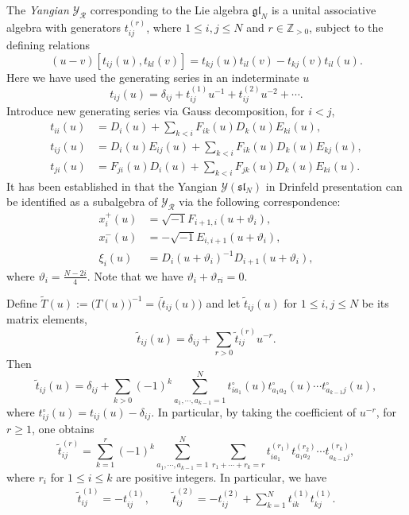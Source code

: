 \documentclass[11pt,reqno]{amsart}
\numberwithin{equation}{section}
\theoremstyle{definition}
\theoremstyle{remark}
\newcommand{\beq}{\begin{equation}}
\newcommand{\eeq}{\end{equation}}
\newcommand{\be}{\begin{equation*}}
\newcommand{\ee}{\end{equation*}}
\newcommand{\bZ}{\mathbb{Z}}
\newcommand{\gl}{\mathfrak{gl}}
\newcommand{\tl}{\tilde}
\newcommand{\wtl}{\widetilde}
\newcommand{\gge}{\geqslant}
\newcommand{\lle}{\leqslant}
\newcommand{\Y}{{\mathscr{Y}}}
\begin{document}
The \textit{Yangian} $\Y_{\mathscr R}$ corresponding to the Lie algebra $\gl_N$ is a unital associative algebra with generators $t_{ij}^{(r)}$, where $1\lle i,j\lle N$ and $r\in\bZ_{>0}$, subject to the defining relations 
\be
(u-v)[t_{ij}(u),t_{kl}(v)]=t_{kj}(u)t_{il}(v)-t_{kj}(v)t_{il}(u).
\ee
Here we have used the generating series in an indeterminate $u$
\[
t_{ij}(u)=  \delta_{ij}+t_{ij}^{(1)}u^{-1}+t_{ij}^{(2)}u^{-2}+\cdots.
\]
Introduce new generating series via Gauss decomposition, for $i<j$, 
\beq\label{tij-Gauss}
\begin{split}
t_{ii}(u)&=D_i(u)+\sum_{k<i}F_{ik}(u)D_k(u)E_{ki}(u), \\
t_{ij}(u)&=D_i(u)E_{ij}(u)+\sum_{k<i}F_{ik}(u)D_k(u)E_{kj}(u),\\
t_{ji}(u)&=F_{ji}(u)D_i(u)+\sum_{k<i}F_{jk}(u)D_k(u)E_{ki}(u).
\end{split}
\eeq
It has been established in \cite{BK05} that the Yangian $\Y(\mathfrak{sl}_N)$ in Drinfeld presentation can be identified as a subalgebra of $\Y_{\mathscr R}$ via the following correspondence:
\beq\label{eq:Y2-R}
\begin{split}
x_i^+(u)&=\sqrt{-1}F_{i+1,i}(u+\vartheta_i),\\
x_i^-(u)&=-\sqrt{-1}E_{i,i+1}(u+\vartheta_i),\\
\xi_i(u)&= D_{i}(u+\vartheta_i)^{-1}D_{i+1}(u+\vartheta_i),
\end{split}
\eeq
where $\vartheta_i=\tfrac{N-2i}{4}$. Note that we have $\vartheta_i+\vartheta_{\tau i}=0$.

Define $\wtl T(u):=\big(T(u)\big)^{-1}=\big(\tl t_{ij}(u)\big)$ and let $\tl t_{ij}(u)$ for $1\lle i,j\lle N$ be its matrix elements, 
$$
\tl t_{ij}(u)=\delta_{ij}+\sum_{r>0} \tl {t}_{ij}^{(r)}u^{-r}.
$$
Then
\be
\tl t_{ij}(u)=\delta_{ij}+\sum_{k>0} (-1)^k\sum_{a_1,\cdots,a_{k-1}=1}^N t_{ia_1}^\circ(u)t_{a_1a_2}^\circ(u)\cdots t_{a_{k-1}j}^\circ(u),
\ee
where $t_{ij}^\circ(u)=t_{ij}(u)-\delta_{ij}$. In particular, by taking the coefficient of $u^{-r}$, for $r\gge 1$, one obtains 
\be
\tl t_{ij}^{(r)}=\sum_{k=1}^r (-1)^k\sum_{a_1,\cdots,a_{k-1}=1}^N\sum_{r_1+\cdots+r_k=r}t_{ia_1}^{(r_1)}t_{a_1a_2}^{(r_2)}\cdots t_{a_{k-1}j}^{(r_k)},
\ee
where $r_i$ for $1\lle i\lle k$ are positive integers. In particular, we have
\begin{align*}
\tl t_{ij}^{(1)}= -t_{ij}^{(1)}, \qquad \tl t_{ij}^{(2)}= -t_{ij}^{(2)}+\sum_{k=1}^{N}t_{ik}^{(1)}t_{kj}^{(1)}.
\end{align*}
\end{document}
